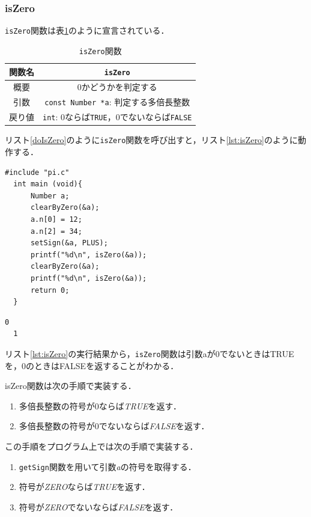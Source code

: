 \documentclass[a4paper,11pt,dvipdfmx]{jsarticle}
\begin{document}
\subsubsection{isZero}
\texttt{isZero}関数は表\ref{table:lst:isZero}のように宣言されている．

\begin{table}[H]
\centering
\caption{\texttt{isZero}関数}
\label{table:lst:isZero}
\begin{tabular}{c||c}
\hline
関数名    & \texttt{isZero}   \\
\hline
概要    & 0かどうかを判定する   \\
\hline
引数    & \texttt{const Number *a}: 判定する多倍長整数   \\
\hline
戻り値    & \texttt{int}: 0ならば\texttt{TRUE}，0でないならば\texttt{FALSE}   \\
\hline
\end{tabular}
\end{table}

リスト\ref{doIsZero}のように\texttt{isZero}関数を呼び出すと，リスト\ref{lst:isZero}のように動作する．
\begin{lstlisting}[caption=\texttt{isZero}関数の呼び出し,label=doIsZero]
  #include "pi.c"
  int main (void){
      Number a;
      clearByZero(&a);
      a.n[0] = 12;
      a.n[2] = 34;
      setSign(&a, PLUS);
      printf("%d\n", isZero(&a));
      clearByZero(&a);
      printf("%d\n", isZero(&a));
      return 0;
  }
\end{lstlisting}

\begin{lstlisting}[caption=リスト\ref{doIsZero}の実行結果,label=lst:isZero]
  0
  1
\end{lstlisting}

リスト\ref{lst:isZero}の実行結果から，\texttt{isZero}関数は引数aが0でないときはTRUEを，0のときはFALSEを返することがわかる．

isZero関数は次の手順で実装する．
\begin{enumerate}
  \item 多倍長整数の符号が0ならば\textit{TRUE}を返す．
  \item 多倍長整数の符号が0でないならば\textit{FALSE}を返す．
\end{enumerate}

この手順をプログラム上では次の手順で実装する．

\begin{enumerate}
  \item \texttt{getSign}関数を用いて引数\textit{a}の符号を取得する．
  \item 符号が\textit{ZERO}ならば\textit{TRUE}を返す．
  \item 符号が\textit{ZERO}でないならば\textit{FALSE}を返す．
\end{enumerate}
\end{document}
